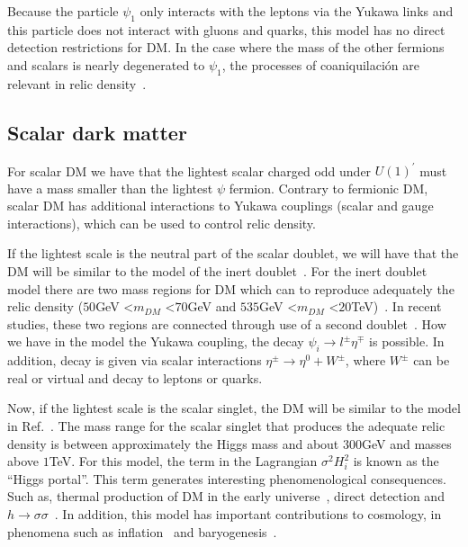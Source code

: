 \documentclass[12pt]{article}
\begin{document}
Because the particle $\psi_{1}$ only interacts with the leptons via the Yukawa links and this particle does not interact with gluons and quarks, this model has no direct detection restrictions for DM. In the case where the mass of the other fermions and scalars is nearly degenerated to $\psi_{1} $, the processes of coaniquilación are relevant in relic density~\cite{Klasen:2013jpa}.

\subsection{Scalar dark matter}
For scalar DM we have that the lightest scalar charged odd under $U(1)^{\prime}$ must have a mass smaller than the lightest $\psi$ fermion. Contrary to fermionic DM, scalar DM has additional interactions to Yukawa couplings (scalar and gauge interactions), which can be used to control relic density.

If the lightest scale is the neutral part of the scalar doublet, we will have that the DM will be similar to the model of the inert doublet~\cite{Honorez:2010re}. For the inert doublet model there are two mass regions for DM which can to reproduce adequately the relic density ($50$GeV \textless $m_{DM}$ \textless $70$GeV and $535$GeV \textless $m_{DM}$ \textless $20$TeV)~\cite{Garcia-Cely:2015khw}. In recent studies, these two regions are connected through use of a second doublet~\cite{Borah:2019aeq}. How we have in the model the Yukawa coupling, the decay $\psi_{i} \to l^{\pm} \eta^{\mp}$ is possible. In addition, decay is given via scalar interactions $\eta^{\pm} \to \eta^{0} + {W^{\pm}}$, where $W^{\pm}$ can be real or virtual and decay to leptons or quarks.

Now, if the lightest scale is the scalar singlet, the DM will be similar to the model in Ref.~\cite{Athron:2017kgt}. The mass range for the scalar singlet that produces the adequate relic density is between approximately the Higgs mass and about $300$GeV and masses above $1$TeV. For this model, the term in the Lagrangian $\sigma^{2} H^{2}_{i}$ is known as the \textquotedblleft Higgs portal\textquotedblright. This term generates interesting phenomenological consequences. Such as, thermal production of DM in the early universe~\cite{Yaguna:2008hd}, direct detection and $h \to \sigma \sigma$~\cite{Mambrini:2011ik}. In addition, this model has important contributions to cosmology, in phenomena such as inflation~\cite{Lerner:2009xg} and baryogenesis~\cite{Cline:2012hg}.
\end{document}
